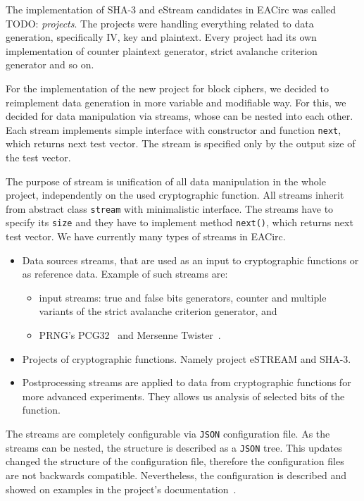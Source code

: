 \documentclass[
  print, %
  Table,   %
  nolof,     %
  nolot,     %
  11pt, %
  oneside  %
]{fithesis3}
\newcommand{\todo}[1]{TODO: \textit{#1}}
\begin{document}
The implementation of SHA-3 and eStream candidates in EACirc was called \todo{projects}. The projects were handling everything related to data generation, specifically IV, key and plaintext. Every project had its own implementation of counter plaintext generator, strict avalanche criterion generator and so on.

For the implementation of the new project for block ciphers, we decided to reimplement data generation in more variable and modifiable way. For this, we decided for data manipulation via streams, whose can be nested into each other. Each stream implements simple interface with constructor and function \texttt{next}, which returns next test vector. The stream is specified only by the output size of the test vector.

The purpose of stream is unification of all data manipulation in the whole project, independently on the used cryptographic function. All streams inherit from abstract class \texttt{stream} with minimalistic interface. The streams have to specify its \texttt{size} and they have to implement method \texttt{next()}, which returns next test vector. We have currently many types of streams in EACirc.

\begin{itemize}
    \item Data sources streams, that are used as an input to cryptographic functions or as reference data. Example of such streams are:
    \begin{itemize}
        \item input streams: true and false bits generators, counter and multiple variants of the strict avalanche criterion generator, and
        \item PRNG's PCG32~\cite{pcgGen} and Mersenne Twister~\cite{matsumoto1998mersenne}.
    \end{itemize}
    \item Projects of cryptographic functions. Namely project eSTREAM and SHA-3.
    \item Postprocessing streams are applied to data from cryptographic functions for more advanced experiments. They allows us analysis of selected bits of the function.
\end{itemize}

The streams are completely configurable via \texttt{JSON} configuration file. As the streams can be nested, the structure is described as a \texttt{JSON} tree. This updates changed the structure of the configuration file, therefore the configuration files are not backwards compatible. Nevertheless, the configuration is described and showed on examples in the project's documentation~\cite{EACirc-wiki-streams}.
\end{document}
